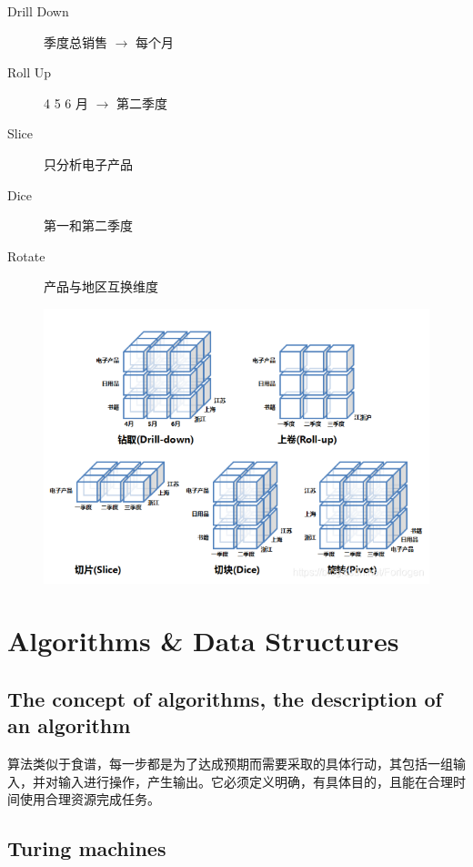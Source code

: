 \documentclass[11pt,journal,compsoc]{IEEEtran}
\begin{document}
\begin{description}
    \item[Drill Down] 季度总销售 $\to$ 每个月

    \item[Roll Up] 4 5 6 月 $\to$ 第二季度

    \item[Slice] 只分析电子产品

    \item[Dice] 第一和第二季度

    \item[Rotate] 产品与地区互换维度
\end{description}

\begin{figure}
    \centering
    \includegraphics[width=\linewidth]{Action.png}
\end{figure}


\section{Algorithms \& Data Structures}


\subsection{The concept of algorithms, the description of an algorithm}

算法类似于食谱，每一步都是为了达成预期而需要采取的具体行动，其包括一组输入，并对输入进行操作，产生输出。它必须定义明确，有具体目的，且能在合理时间使用合理资源完成任务。


\subsection{Turing machines}
\end{document}

